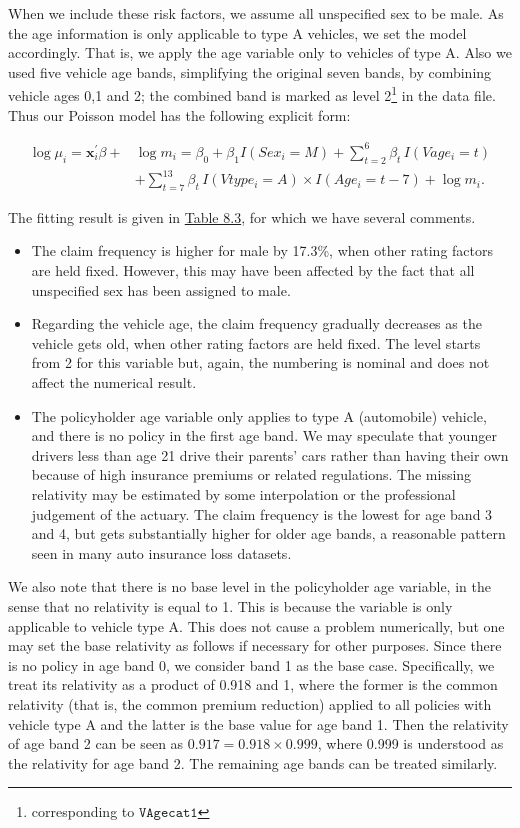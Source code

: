 \documentclass[]{book}
\providecommand{\tightlist}{%
  \setlength{\itemsep}{0pt}\setlength{\parskip}{0pt}}
\let\rmarkdownfootnote\footnote%
\def\footnote{\protect\rmarkdownfootnote}
\theoremstyle{definition}
\theoremstyle{definition}
\theoremstyle{definition}
\theoremstyle{remark}
\begin{document}
When we include these risk factors, we assume all unspecified sex to be
male. As the age information is only applicable to type A vehicles, we
set the model accordingly. That is, we apply the age variable only to
vehicles of type A. Also we used five vehicle age bands, simplifying the
original seven bands, by combining vehicle ages 0,1 and 2; the combined
band is marked as level 2\footnote{corresponding to
  \(\texttt{VAgecat1}\)} in the data file. Thus our Poisson model has
the following explicit form:

\begin{align*}
\log \mu_i= \mathbf{ x}^{\prime}_i\beta+&\log m_i=\beta_0+\beta_1 I(Sex_i=M)+ \sum_{t=2}^6 \beta_t\, I(Vage_i=t) \\
&+  \sum_{t=7}^{13} \beta_t \,I(Vtype_i=A)\times I(Age_i=t-7)+\log m_i.
\end{align*}

The fitting result is given in \protect\hyperlink{tab:8.3}{Table 8.3},
for which we have several comments.

\begin{itemize}
\tightlist
\item
  The claim frequency is higher for male by 17.3\%, when other rating
  factors are held fixed. However, this may have been affected by the
  fact that all unspecified sex has been assigned to male.\\
\item
  Regarding the vehicle age, the claim frequency gradually decreases as
  the vehicle gets old, when other rating factors are held fixed. The
  level starts from 2 for this variable but, again, the numbering is
  nominal and does not affect the numerical result.\\
\item
  The policyholder age variable only applies to type A (automobile)
  vehicle, and there is no policy in the first age band. We may
  speculate that younger drivers less than age 21 drive their parents'
  cars rather than having their own because of high insurance premiums
  or related regulations. The missing relativity may be estimated by
  some interpolation or the professional judgement of the actuary. The
  claim frequency is the lowest for age band 3 and 4, but gets
  substantially higher for older age bands, a reasonable pattern seen in
  many auto insurance loss datasets.
\end{itemize}

We also note that there is no base level in the policyholder age
variable, in the sense that no relativity is equal to 1. This is because
the variable is only applicable to vehicle type A. This does not cause a
problem numerically, but one may set the base relativity as follows if
necessary for other purposes. Since there is no policy in age band 0, we
consider band 1 as the base case. Specifically, we treat its relativity
as a product of 0.918 and 1, where the former is the common relativity
(that is, the common premium reduction) applied to all policies with
vehicle type A and the latter is the base value for age band 1. Then the
relativity of age band 2 can be seen as \(0.917=0.918 \times 0.999\),
where 0.999 is understood as the relativity for age band 2. The
remaining age bands can be treated similarly.
\end{document}
